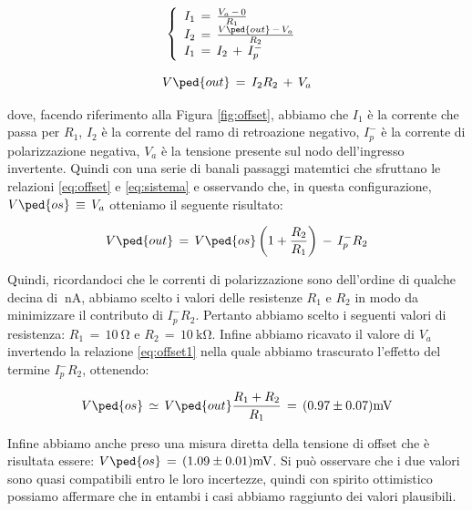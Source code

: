 \begin{equation}
	\left\{
  \begin{array}{l l l}
    I_1\,=\,\frac{V_a\,-\,0}{R_1}\\
    I_2\,=\,\frac{V\ped{out}\,-\,V_a}{R_2}\\
    I_1\,=\,I_2\,+\,I_{p}^-
  \end{array} \right.\
  \label{eq:sistema}
\end{equation}

\begin{equation}
	V\ped{out}\,=\,I_2R_2\,+\,V_a
	\label{eq:offset}
\end{equation}

dove, facendo riferimento alla Figura \ref{fig:offset}, abbiamo che $I_1$ è la corrente che passa per $R_1$, $I_2$ è la corrente del ramo di retroazione negativo, $I_{p}^-$ è la corrente di polarizzazione negativa, $V_a$ è la tensione presente sul nodo dell'ingresso invertente.
Quindi con una serie di banali passaggi matemtici che sfruttano le relazioni \ref{eq:offset} e \ref{eq:sistema} e osservando che, in questa configurazione, $V\ped{os}\,\equiv\,V_a$ otteniamo il seguente risultato:

\begin{equation}
	V\ped{out}\,=\,V\ped{os}\left(1+\frac{R_2}{R_1}\right)\,-\,I_{p}^-R_2
	\label{eq:offset1}
\end{equation}

Quindi, ricordandoci che le correnti di polarizzazione sono dell'ordine di qualche decina di $\SI{}{\nano\ampere}$, abbiamo scelto i valori delle resistenze $R_1$ e $R_2$ in modo da minimizzare il contributo di $I_{p}^-R_2$. Pertanto abbiamo scelto i seguenti valori di resistenza: $R_1\,=\,\SI{10}{\ohm}$ e $R_2\,=\,\SI{10}{\kilo\ohm}$.
Infine abbiamo ricavato il valore di $V_a$ invertendo la relazione \ref{eq:offset1} nella quale abbiamo trascurato l'effetto del termine $I_{p}^-R_2$, ottenendo:

\begin{equation}
	V\ped{os}\,\simeq\,V\ped{out}\frac{R_1+R_2}{R_1}\,=\, (0.97 \pm 0.07)\SI{}{\milli\volt}
\end{equation}

Infine abbiamo anche preso una misura diretta della tensione di offset che è risultata essere: $V\ped{os}\,=\,(1.09\pm0.01)\SI{}{\milli\volt}$. Si può osservare che i due valori sono quasi compatibili entro le loro incertezze, quindi con spirito ottimistico possiamo affermare che in entambi i casi abbiamo raggiunto dei valori plausibili.

